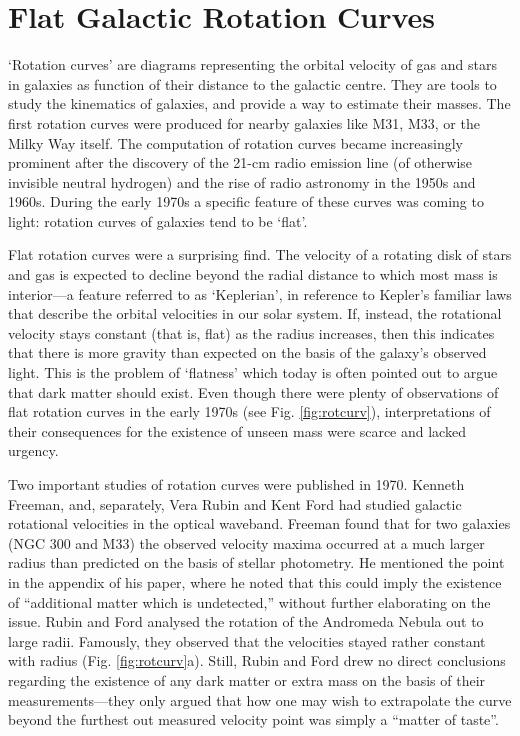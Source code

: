 \documentclass{naturefig}
\begin{document}
\vspace{8pt}

\section*{Flat Galactic Rotation Curves}

`Rotation curves' are diagrams representing the orbital velocity of gas and stars in galaxies as function of their distance to the galactic centre. They are tools to study the kinematics of galaxies, and provide a way to estimate their masses. The first rotation curves were produced for nearby galaxies like M31, M33, or the Milky Way itself.\cite{Lindblad1927,Oort1927,Babcock1939,Mayall1942} The computation of rotation curves became increasingly prominent after the discovery of the 21-cm radio emission line\cite{Ewen1951,Muller1951,Pawsey1951} (of otherwise invisible neutral hydrogen) and the rise of radio astronomy in the 1950s and 1960s. During the early 1970s a specific feature of these curves was coming to light: rotation curves of galaxies tend to be `flat'.

Flat rotation curves were a surprising find. The velocity of a rotating disk of stars and gas is expected to decline beyond the radial distance to which most mass is interior---a feature referred to as `Keplerian', in reference to Kepler's familiar laws that describe the orbital velocities in our solar system. If, instead, the rotational velocity stays constant (that is, flat) as the radius increases, then this indicates that there is more gravity than expected on the basis of the galaxy's observed light. This is the problem of `flatness' which today is often pointed out to argue that dark matter should exist.
Even though there were plenty of observations of flat rotation curves in the early 1970s (see Fig. \ref{fig:rotcurv}), interpretations of their consequences for the existence of unseen mass were scarce and lacked urgency.

Two important studies of rotation curves were published in 1970. Kenneth Freeman, and, separately, Vera Rubin and Kent Ford had studied galactic rotational velocities in the optical waveband. Freeman found that for two galaxies (NGC 300 and M33) the observed velocity maxima occurred at a much larger radius than predicted on the basis of stellar photometry. He mentioned the point in the appendix of his paper, where he noted that this could imply the existence of ``additional matter which is undetected,''\cite{Freeman1970} without further elaborating on the issue. Rubin and Ford analysed the rotation of the Andromeda Nebula out to large radii. Famously, they observed that the velocities stayed rather constant with radius (Fig. \ref{fig:rotcurv}a). Still, Rubin and Ford drew no direct conclusions regarding the existence of any dark matter or extra mass on the basis of their measurements---they only argued that how one may wish to extrapolate the curve beyond the furthest out measured velocity point was simply a ``matter of taste''.\cite{Rubin1970} %
\end{document}
